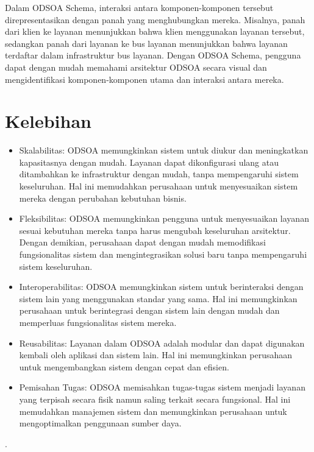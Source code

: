 Dalam ODSOA Schema, interaksi antara komponen-komponen tersebut direpresentasikan dengan panah yang menghubungkan mereka. Misalnya, panah dari klien ke layanan menunjukkan bahwa klien menggunakan layanan tersebut, sedangkan panah dari layanan ke bus layanan menunjukkan bahwa layanan terdaftar dalam infrastruktur bus layanan. Dengan ODSOA Schema, pengguna dapat dengan mudah memahami arsitektur ODSOA secara visual dan mengidentifikasi komponen-komponen utama dan interaksi antara mereka.

\section{Kelebihan}
\begin{itemize}
\item Skalabilitas: ODSOA memungkinkan sistem untuk diukur dan meningkatkan kapasitasnya dengan mudah. Layanan dapat dikonfigurasi ulang atau ditambahkan ke infrastruktur dengan mudah, tanpa mempengaruhi sistem keseluruhan. Hal ini memudahkan perusahaan untuk menyesuaikan sistem mereka dengan perubahan kebutuhan bisnis.
\item Fleksibilitas: ODSOA memungkinkan pengguna untuk menyesuaikan layanan sesuai kebutuhan mereka tanpa harus mengubah keseluruhan arsitektur. Dengan demikian, perusahaan dapat dengan mudah memodifikasi fungsionalitas sistem dan mengintegrasikan solusi baru tanpa mempengaruhi sistem keseluruhan.
\item Interoperabilitas: ODSOA memungkinkan sistem untuk berinteraksi dengan sistem lain yang menggunakan standar yang sama. Hal ini memungkinkan perusahaan untuk berintegrasi dengan sistem lain dengan mudah dan memperluas fungsionalitas sistem mereka.
\item Reusabilitas: Layanan dalam ODSOA adalah modular dan dapat digunakan kembali oleh aplikasi dan sistem lain. Hal ini memungkinkan perusahaan untuk mengembangkan sistem dengan cepat dan efisien.
\item Pemisahan Tugas: ODSOA memisahkan tugas-tugas sistem menjadi layanan yang terpisah secara fisik namun saling terkait secara fungsional. Hal ini memudahkan manajemen sistem dan memungkinkan perusahaan untuk mengoptimalkan penggunaan sumber daya.
\end{itemize}
.
